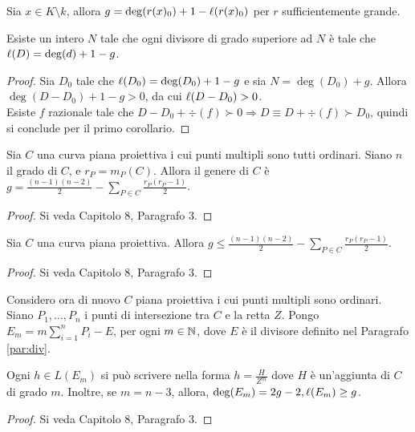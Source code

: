         \begin{corollario}
            Sia $x \in K \setminus k$, allora $g = \deg(r(x)_0) + 1 - 
            \ell(r(x)_0)$ per $r$ sufficientemente grande.
        \end{corollario}
        \begin{corollario}
            Esiste un intero $N$ tale che ogni divisore di grado superiore ad 
            $N$ è tale che $\ell(D) = \deg(d) + 1 - g$.
        \end{corollario}
        \begin{proof}
            Sia $D_0$ tale che $\ell(D_0) = \deg(D_0) + 1 - g$ e sia $N = 
            \deg(D_0) + g$. Allora $\deg(D - D_0) + 1 -g > 0$, da cui 
            $\ell(D-D_0) > 0$. \\
            Esiste $f$ razionale tale che $D - D_0 + \div(f) \succ 0 
            \Longrightarrow D \equiv D + \div(f) \succ D_0$, quindi si 
            conclude per il primo corollario.
        \end{proof}
        \begin{proposizione} \label{prop:genus}
            Sia $C$ una curva piana proiettiva i cui punti multipli sono tutti 
            ordinari. Siano $n$ il grado di $C$, e $r_P = m_P(C)$. Allora il 
            genere di $C$ è $g = \frac{(n-1)(n-2)}{2} - \sum_{P \in C} 
            \frac{r_P(r_P - 1)}{2}$.
        \end{proposizione}
        \begin{proof}
            Si veda \cite{fulton} Capitolo $8$, Paragrafo $3$.
        \end{proof}
        \begin{corollario}
            Sia $C$ una curva piana proiettiva. Allora $g \leq 
            \frac{(n-1)(n-2)}{2} - \sum_{P \in C} \frac{r_P(r_P - 1)}{2}$.
        \end{corollario}
        \begin{proof}
            Si veda \cite{fulton} Capitolo $8$, Paragrafo $3$.
        \end{proof}
        Considero ora di nuovo $C$ piana proiettiva i cui punti multipli sono 
        ordinari. Siano $P_1,\ldots,P_n$ i punti di intersezione tra $C$ e la 
        retta $Z$. Pongo $E_m = m \sum_{i=1}^n P_i - E$, per ogni $m \in \mathbb{N}$, 
        dove $E$ è il divisore definito nel Paragrafo \ref{par:div}. 
        \begin{proposizione} \label{prop:en-3}
            Ogni $h \in L(E_m)$ si può scrivere nella forma $h = 
            \frac{H}{Z^m}$ dove $H$ è un'aggiunta di $C$ di grado $m$. 
            Inoltre, se $m = n-3$, allora, $\deg(E_m) = 2g -2, \ell(E_m) \geq g$. 
        \end{proposizione}
        \begin{proof}
            Si veda \cite{fulton} Capitolo $8$, Paragrafo $3$.
        \end{proof}
        